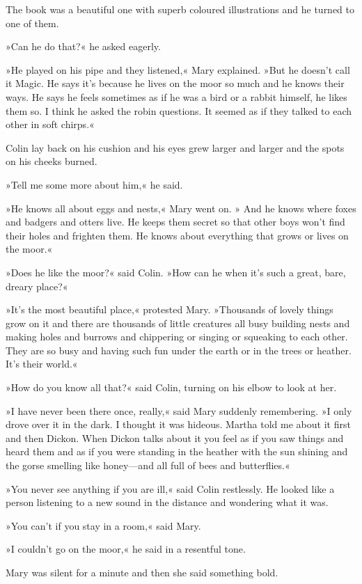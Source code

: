 The book was a beautiful one with superb coloured illustrations and he turned to one of them.

»Can he do that?« he asked eagerly.

»He played on his pipe and they listened,« Mary explained. »But he doesn't call it Magic. He says it's because he lives on the moor so much and he knows their ways. He says he feels sometimes as if he was a bird or a rabbit himself, he likes them so. I think he asked the robin questions. It seemed as if they talked to each other in soft chirps.«

Colin lay back on his cushion and his eyes grew larger and larger and the spots on his cheeks burned.

»Tell me some more about him,« he said.

»He knows all about eggs and nests,« Mary went on. » And he knows where foxes and badgers and otters live. He keeps them secret so that other boys won't find their holes and frighten them. He knows about everything that grows or lives on the moor.«

»Does he like the moor?« said Colin. »How can he when it's such a great, bare, dreary place?«

»It's the most beautiful place,« protested Mary. »Thousands of lovely things grow on it and there are thousands of little creatures all busy building nests and making holes and burrows and chippering or singing or squeaking to each other. They are so busy and having such fun under the earth or in the trees or heather. It's their world.«

»How do you know all that?« said Colin, turning on his elbow to look at her.

»I have never been there once, really,« said Mary suddenly remembering. »I only drove over it in the dark. I thought it was hideous. Martha told me about it first and then Dickon. When Dickon talks about it you feel as if you saw things and heard them and as if you were standing in the heather with the sun shining and the gorse smelling like honey—and all full of bees and butterflies.«

»You never see anything if you are ill,« said Colin restlessly. He looked like a person listening to a new sound in the distance and wondering what it was.

»You can't if you stay in a room,« said Mary.

»I couldn't go on the moor,« he said in a resentful tone.

Mary was silent for a minute and then she said something bold.

